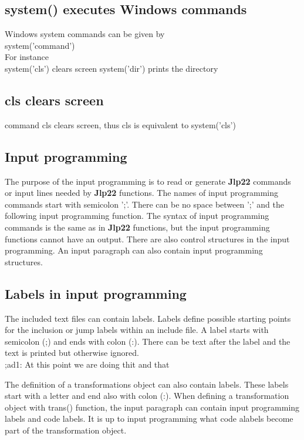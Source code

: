 \subsection{\textcolor{VioletRed}{system}() executes Windows commands} 
\label{systemcom} 
Windows system commands can be given by\\ 
\textcolor{VioletRed}{system}('command')\\ 
For instance \\ 
\textcolor{VioletRed}{system}('cls') clears screen 
\textcolor{VioletRed}{system}('dir') prints the directory 
\subsection{cls clears screen} 
\label{cls} 
command cls clears screen, thus cls is equivalent to \textcolor{VioletRed}{system}('cls') 
\subsection{Input programming} 
\label{inpuprog} 
The purpose of the input programming is to read or generate \textbf{Jlp22} commands or input lines 
needed by \textbf{Jlp22} functions. The names of input programming commands start with semicolon ';'. 
There can be no space between ';' and the following input programming function. The syntax 
of input programming commands is the same as in \textbf{Jlp22} functions, but the input programming 
functions cannot have an output. There are also control structures in the input programming. 
An input paragraph can also contain input programming structures. 
\subsection{ Labels in input programming} 
\label{inpuad} 
 
The included text files can contain labels. Labels define possible starting points for the 
inclusion or jump labels within an include file. A label starts with semicolon (;) and 
ends with colon (:). There can be text after the label and the text is printed but 
otherwise ignored.\\ 
 
 
;ad1:  At this point we are doing thit and that 
 
 
\begin{note} 
The definition of a transformations object can also contain labels. These labels start 
with a letter and end also with colon (:). When defining a transformation object with \textcolor{VioletRed}{trans}() function, 
the input paragraph can contain input programming labels and code labels. It is up to 
input programming what code alabels become part of the transformation object. 
\end{note} 
 
